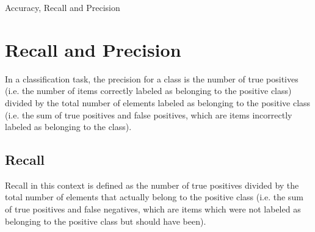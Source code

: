 \documentclass[12pt]{article}
\begin{document}
\begin{center}
\LARGE{Accuracy, Recall and Precision}
\end{center}

\section{Recall and Precision}
In a classification task, the precision for a class is the number of true positives (i.e. the number of items correctly labeled as belonging to the positive class) divided by the total number of elements labeled as belonging to the positive class (i.e. the sum of true positives and false positives, which are items incorrectly labeled as belonging to the class). 

\subsection*{Recall}
Recall in this context is defined as the number of true positives divided by the total number of elements that actually belong to the positive class (i.e. the sum of true positives and false negatives, which are items which were not labeled as belonging to the positive class but should have been).
\end{document}
